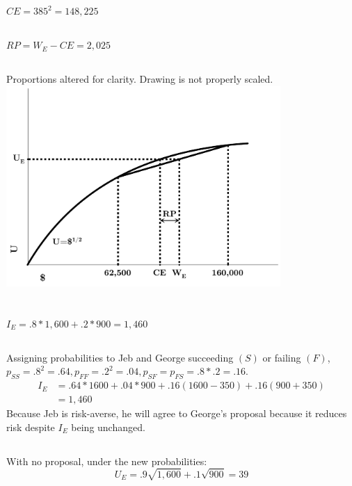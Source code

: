 \documentclass{article}
\begin{document}
	\subsection[b]{}
		$ CE = 385^2 = 148,225 $
	\subsection[c]{}
		$ RP = W_E - CE = 2,025 $
	\subsection[d]{}
		Proportions altered for clarity. Drawing is not properly scaled.  \\
		\includegraphics[height=3in]{Charts/5d}	

\section[6]{}
	\subsection[a]{}
		$ I_E = .8 * 1,600 + .2 * 900 = 1,460 $
	\subsection[b]{}
		Assigning probabilities to Jeb and George succeeding $(S)$ or failing $(F)$, $ p_{SS} = .8^2 = .64, p_{FF} =.2^2 = .04, p_{SF}=p_{FS} = .8*.2 =.16 $.
		\begin{align*}
			I_E &= .64 * 1600 + .04*900 + .16(1600-350) + .16(900+350) \\
			&= 1,460
		\end{align*}
		Because Jeb is risk-averse, he will agree to George's proposal because it reduces risk despite $I_E$ being unchanged.
	\subsection[c]{}
		With no proposal, under the new probabilities:
		$$ U_E = .9 \sqrt{1,600} + .1\sqrt{900}=39 $$
		
\end{document}
